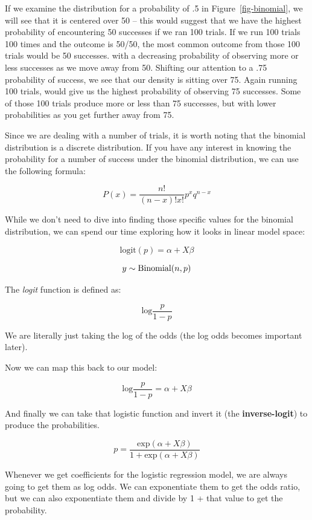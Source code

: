 \documentclass[
  letterpaper,
]{krantz}
\begin{document}
If we examine the distribution for a probability of .5 in
Figure~\ref{fig-binomial}, we will see that it is centered over 50 --
this would suggest that we have the highest probability of encountering
50 successes if we ran 100 trials. If we run 100 trials 100 times and
the outcome is 50/50, the most common outcome from those 100 trials
would be 50 successes. with a decreasing probability of observing more
or less successes as we move away from 50. Shifting our attention to a
.75 probability of success, we see that our density is sitting over 75.
Again running 100 trials, would give us the highest probability of
observing 75 successes. Some of those 100 trials produce more or less
than 75 successes, but with lower probabilities as you get further away
from 75.

Since we are dealing with a number of trials, it is worth noting that
the binomial distribution is a discrete distribution. If you have any
interest in knowing the probability for a number of success under the
binomial distribution, we can use the following formula:

\[P(x) = \frac{n!}{(n-x)!x!}p^xq^{n-x}\]

While we don't need to dive into finding those specific values for the
binomial distribution, we can spend our time exploring how it looks in
linear model space:

\[
\textrm{logit}(p) = \alpha + X\beta
\]

\[y \sim \textrm{Binomial}(n, p) \\ \]

The \emph{logit} function is defined as:

\[\textrm{log}\frac{p}{1-p}\]

We are literally just taking the log of the odds (the log odds becomes
important later).

Now we can map this back to our model:

\[\textrm{log}\frac{p}{1-p} = \alpha + X\beta\]

And finally we can take that logistic function and invert it (the
\textbf{inverse-logit}) to produce the probabilities.

\[p = \frac{\textrm{exp}(\alpha + X\beta)}{1 + \textrm{exp}(\alpha + X\beta)}\]

Whenever we get coefficients for the logistic regression model, we are
always going to get them as log odds. We can exponentiate them to get
the odds ratio, but we can also exponentiate them and divide by 1 + that
value to get the probability.
\end{document}
